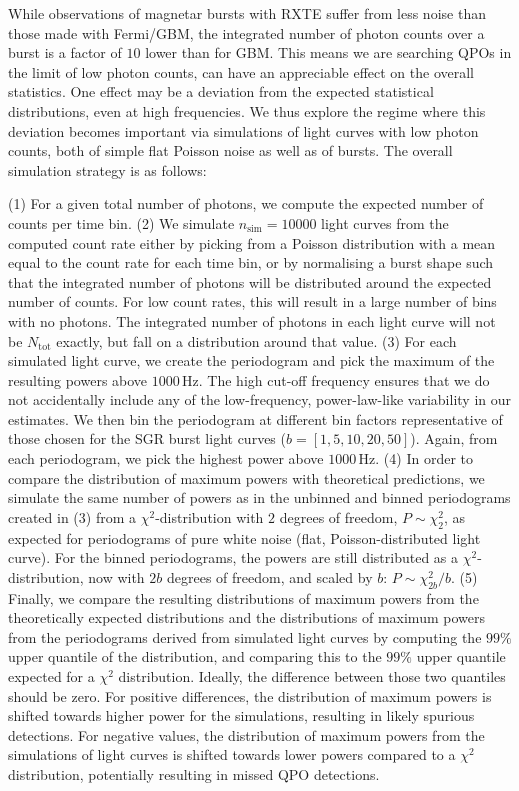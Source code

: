 \documentclass[numberedappendix]{emulateapj}
\newcommand{\hz}{\,\mathrm{Hz}}
\begin{document}
While observations of magnetar bursts with RXTE suffer from less noise than those made with Fermi/GBM, the integrated number of photon counts over a burst is a factor of $10$ lower than for GBM. This means we are searching QPOs in the limit of low photon counts, can have an appreciable effect on the overall statistics. One effect may be a deviation from the expected statistical distributions, even at high frequencies. We thus explore the regime where this deviation becomes important via simulations of light curves with low photon counts, both of simple flat Poisson noise as well as of bursts.
The overall simulation strategy is as follows:

(1) For a given total number of photons, we compute the expected number of counts per time bin. 
(2) We simulate $n_{\mathrm{sim}} = 10000$ light curves from the computed count rate either by picking from a Poisson distribution with a mean equal to the count rate for each time bin, or by normalising a burst shape such that the integrated number of photons will be distributed around the expected number of counts. For low count rates, this will result in a large number of bins with no photons. The integrated number of photons in each light curve will not be $N_{\mathrm{tot}}$ exactly, but fall on a distribution around that value.
(3) For each simulated light curve, we create the periodogram and pick the maximum of the resulting powers above $1000 \hz$. The high cut-off frequency ensures that we do not accidentally include any of the low-frequency, power-law-like variability in our estimates. We then bin the periodogram at different bin factors representative of those chosen for the SGR burst light curves ($b = [1, 5, 10, 20, 50]$). Again, from each periodogram, we pick the highest power above $1000 \hz$.
(4) In order to compare the distribution of maximum powers with theoretical predictions, we simulate the same number of powers as in the unbinned and binned periodograms created in (3) from a $\chi^2$-distribution with $2$ degrees of freedom, $P \sim \chi^2_2$, as expected for periodograms of pure white noise (flat, Poisson-distributed light curve). For the binned periodograms, the powers are still distributed as a $\chi^2$-distribution, now with $2b$ degrees of freedom, and scaled by $b$: $P \sim \chi^2_{2b}/b$.
(5) Finally, we compare the resulting distributions of maximum powers from the theoretically expected distributions and the distributions of maximum powers from the periodograms derived from simulated light curves by computing the $99\%$ upper quantile of the distribution, and comparing this to the $99\%$ upper quantile expected for a $\chi^2$ distribution. Ideally, the difference between those two quantiles should be zero. For positive differences, the distribution of maximum powers is shifted towards higher power for the simulations, resulting in likely spurious detections. For negative values, the distribution of maximum powers from the simulations of light curves is shifted towards lower powers compared to a $\chi^2$ distribution, potentially resulting in missed QPO detections.
\end{document}
